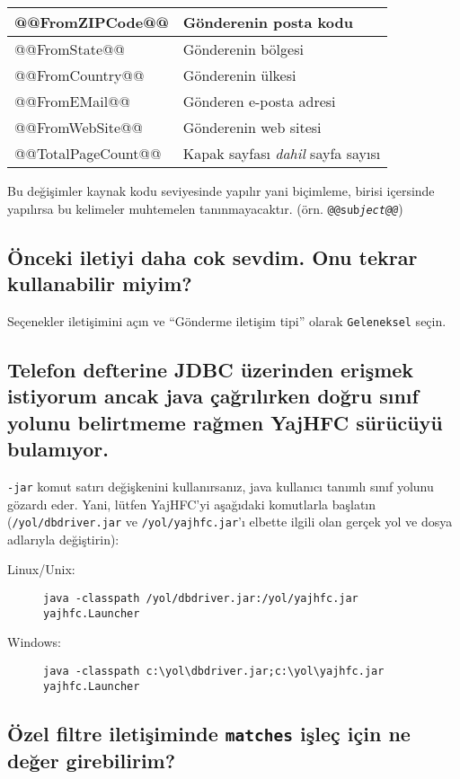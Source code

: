 \documentclass[a4paper,10pt]{scrartcl}
\begin{document}
\begin{center}
\begin{tabular}{|l|p{}|}
\ttfamily @@FromZIPCode@@ & Gönderenin posta kodu \\\hline
\ttfamily @@FromState@@ & Gönderenin bölgesi\\\hline
\ttfamily @@FromCountry@@ & Gönderenin ülkesi\\\hline
\ttfamily @@FromEMail@@ & Gönderen e-posta adresi\\\hline
\ttfamily @@FromWebSite@@ & Gönderenin web sitesi\\\hline
\ttfamily @@TotalPageCount@@ & Kapak sayfası \textit{dahil} sayfa sayısı\\\hline
\end{tabular}
\end{center}

Bu değişimler kaynak kodu seviyesinde yapılır yani biçimleme, birisi içersinde yapılırsa bu kelimeler muhtemelen tanınmayacaktır. (örn. \texttt{@@sub\textit{ject@@}})

\subsection{Önceki iletiyi daha cok sevdim. Onu tekrar kullanabilir miyim?}

Seçenekler iletişimini açın ve ``Gönderme iletişim tipi'' olarak \texttt{Geleneksel} seçin.

\subsection{Telefon defterine JDBC üzerinden erişmek istiyorum ancak java çağrılırken doğru sınıf yolunu belirtmeme rağmen YajHFC sürücüyü bulamıyor.}

\texttt{-jar} komut satırı değişkenini kullanırsanız, java kullanıcı tanımlı sınıf yolunu gözardı eder.
Yani, lütfen YajHFC'yi aşağıdaki komutlarla başlatın (\texttt{/yol/dbdriver.jar} ve \texttt{/yol/yajhfc.jar}'ı elbette ilgili olan gerçek yol ve dosya adlarıyla değiştirin):

\begin{description}
\item [Linux/Unix:] \verb#java -classpath /yol/dbdriver.jar:/yol/yajhfc.jar yajhfc.Launcher#
\item [Windows:] \verb#java -classpath c:\yol\dbdriver.jar;c:\yol\yajhfc.jar yajhfc.Launcher#
\end{description}

\subsection{Özel filtre iletişiminde \texttt{matches} işleç için ne değer girebilirim?}
\end{document}
